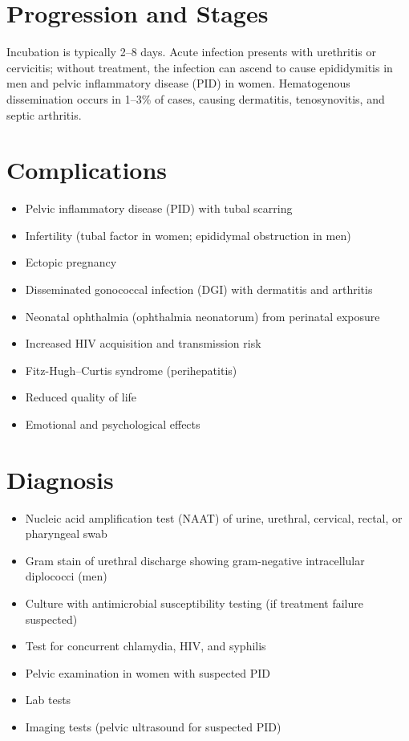 \section{Progression and Stages}
Incubation is typically 2--8 days. Acute infection presents with urethritis or cervicitis; without treatment, the infection can ascend to cause epididymitis in men and pelvic inflammatory disease (PID) in women. Hematogenous dissemination occurs in 1--3\% of cases, causing dermatitis, tenosynovitis, and septic arthritis.

\section{Complications}

\begin{itemize}[noitemsep]
  \item Pelvic inflammatory disease (PID) with tubal scarring
  \item Infertility (tubal factor in women; epididymal obstruction in men)
  \item Ectopic pregnancy
  \item Disseminated gonococcal infection (DGI) with dermatitis and arthritis
  \item Neonatal ophthalmia (ophthalmia neonatorum) from perinatal exposure
  \item Increased HIV acquisition and transmission risk
  \item Fitz-Hugh--Curtis syndrome (perihepatitis)
  \item Reduced quality of life
  \item Emotional and psychological effects
\end{itemize}

\section{Diagnosis}

\begin{itemize}[noitemsep]
  \item Nucleic acid amplification test (NAAT) of urine, urethral, cervical, rectal, or pharyngeal swab
  \item Gram stain of urethral discharge showing gram-negative intracellular diplococci (men)
  \item Culture with antimicrobial susceptibility testing (if treatment failure suspected)
  \item Test for concurrent chlamydia, HIV, and syphilis
  \item Pelvic examination in women with suspected PID
  \item Lab tests
  \item Imaging tests (pelvic ultrasound for suspected PID)
\end{itemize}

